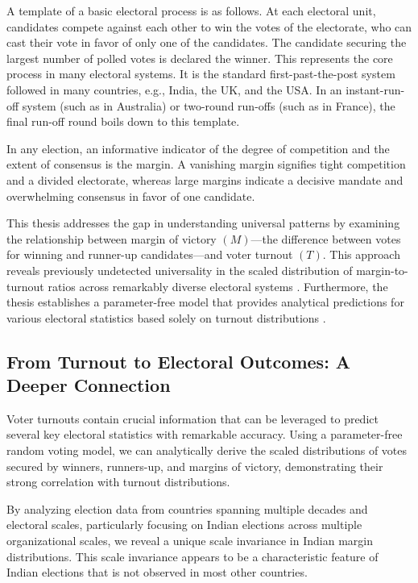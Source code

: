 A template of a basic electoral process is as follows. At each electoral unit, candidates compete against each other to win the votes of the electorate, who can cast their vote in favor of only one of the candidates. The candidate securing the largest number of polled votes is declared the winner. This represents the core process in many electoral systems. It is the standard first-past-the-post system followed in many countries, e.g., India, the UK, and the USA. In an instant-run-off system (such as in Australia) or two-round run-offs (such as in France), the final run-off round boils down to this template.

In any election, an informative indicator of the degree of competition and the extent of consensus is the margin. A vanishing margin signifies tight competition and a divided electorate, whereas large margins indicate a decisive mandate and overwhelming consensus in favor of one candidate.

This thesis addresses the gap in understanding universal patterns by examining the relationship between margin of victory $(M)$—the difference between votes for winning and runner-up candidates—and voter turnout $(T)$. This approach reveals previously undetected universality in the scaled distribution of margin-to-turnout ratios across remarkably diverse electoral systems \cite{universal-statistics-of-competition}. Furthermore, the thesis establishes a parameter-free model that provides analytical predictions for various electoral statistics based solely on turnout distributions \cite{voter-turnouts-govern-key-electoral-statistics}.

\subsection{From Turnout to Electoral Outcomes: A Deeper Connection}

Voter turnouts contain crucial information that can be leveraged to predict several key electoral statistics with remarkable accuracy. Using a parameter-free random voting model, we can analytically derive the scaled distributions of votes secured by winners, runners-up, and margins of victory, demonstrating their strong correlation with turnout distributions.

By analyzing election data from countries spanning multiple decades and electoral scales, particularly focusing on Indian elections across multiple organizational scales, we reveal a unique scale invariance in Indian margin distributions. This scale invariance appears to be a characteristic feature of Indian elections that is not observed in most other countries.

